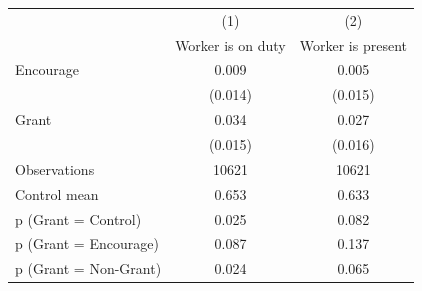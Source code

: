 \begin{tabular*}{\hsize}{@{\hskip\tabcolsep\extracolsep\fill}l*{2}{c}}
\toprule
                    &\multicolumn{1}{c}{(1)}&\multicolumn{1}{c}{(2)}\\
                    &\multicolumn{1}{c}{Worker is on duty}&\multicolumn{1}{c}{Worker is present}\\
\midrule
Encourage           &       0.009&       0.005\\
                    &     (0.014)&     (0.015)\\
\addlinespace
Grant               &       0.034&       0.027\\
                    &     (0.015)&     (0.016)\\
\midrule
Observations        &       10621&       10621\\
Control mean        &       0.653&       0.633\\
p (Grant = Control) &       0.025&       0.082\\
p (Grant = Encourage)&       0.087&       0.137\\
p (Grant = Non-Grant)&       0.024&       0.065\\
\bottomrule
\end{tabular*}
